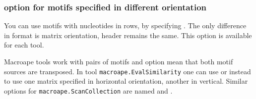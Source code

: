 \subsubsection{ option for motifs specified in different orientation}\label{TransposeOption}
You can use motifs with nucleotides in rows, by specifying . The only difference in format is matrix orientation, header remains the same. This option is available for each tool.

Macroape tools work with pairs of motifs and  option mean that both motif sources are transposed. In tool \texttt{macroape.EvalSimilarity} one can use  or  instead to use one matrix specified in horizontal orientation, another in vertical. Similar options for \texttt{macroape.ScanCollection} are named  and .
